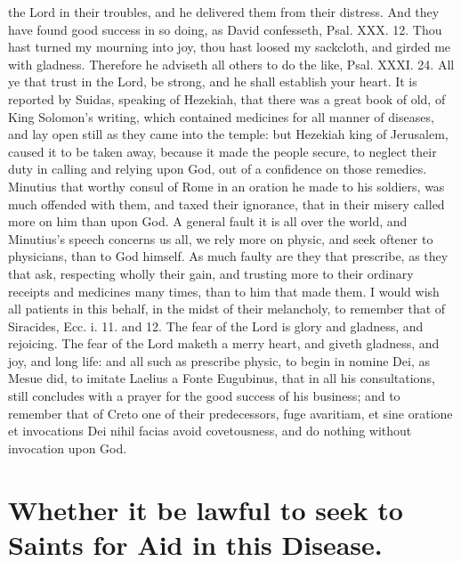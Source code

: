{the Lord in their troubles, and he delivered them from their distress.
And they have found good success in so doing, as David confesseth,
Psal. XXX. 12. Thou hast turned my mourning into joy, thou hast loosed
my sackcloth, and girded me with gladness. Therefore he adviseth all
others to do the like, Psal. XXXI. 24. All ye that trust in the Lord,
be strong, and he shall establish your heart. It is reported by
Suidas, speaking of Hezekiah, that there was a great book of old,
of King Solomon's writing, which contained medicines for all manner of
diseases, and lay open still as they came into the temple: but Hezekiah
king of Jerusalem, caused it to be taken away, because it made the
people secure, to neglect their duty in calling and relying upon God,
out of a confidence on those remedies. Minutius that worthy
consul of Rome in an oration he made to his soldiers, was much offended
with them, and taxed their ignorance, that in their misery called more
on him than upon God. A general fault it is all over the world, and
Minutius's speech concerns us all, we rely more on physic, and seek
oftener to physicians, than to God himself. As much faulty are they
that prescribe, as they that ask, respecting wholly their gain, and
trusting more to their ordinary receipts and medicines many times, than
to him that made them. I would wish all patients in this behalf, in the
midst of their melancholy, to remember that of Siracides, Ecc. i. 11.
and 12. The fear of the Lord is glory and gladness, and rejoicing. The
fear of the Lord maketh a merry heart, and giveth gladness, and joy,
and long life: and all such as prescribe physic, to begin in nomine
Dei, as Mesue did, to imitate Laelius a Fonte Eugubinus, that in
all his consultations, still concludes with a prayer for the good
success of his business; and to remember that of Creto one of their
predecessors, fuge avaritiam, et sine oratione et invocations Dei nihil
facias avoid covetousness, and do nothing without invocation upon God.


\section[Whether it be lawful to seek to Saints for Aid]{Whether it be lawful to seek to Saints for Aid in this Disease.}

}

